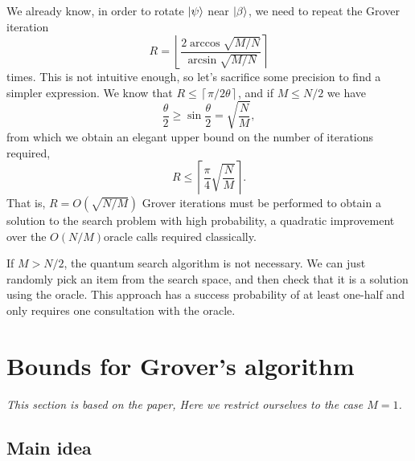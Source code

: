 \documentclass[a4paper,10pt]{book}
\numberwithin{equation}{section}
\begin{document}
We already know, in order to rotate $\ket{\psi}$ near $\ket{\beta}$, we need to repeat the Grover iteration
\begin{equation}\label{eq:IterationsGrover}
    R=\left\lfloor\frac{2\arccos\sqrt{M/N}}{\arcsin\sqrt{M/N}}\right\rceil
\end{equation}
times. This is not intuitive enough, so let's sacrifice some precision to find a simpler expression. We know that $R\leq\left\lceil\pi/2\theta\right\rceil$, and if $M\leq N/2$ we have
\begin{equation}
    \frac{\theta}{2}\geq\sin\frac{\theta}{2}=\sqrt{\frac{N}{M}},
\end{equation}
from which we obtain an elegant upper bound on the number of iterations required,
\begin{equation}
    R\leq\left\lceil\frac{\pi}{4}\sqrt{\frac{N}{M}}\right\rceil.
\end{equation}
That is, $R=O(\sqrt{N/M})$ Grover iterations must be performed to obtain a solution to the search problem with high probability, a quadratic improvement over the $O(N/M)$oracle calls required classically.

If $M>N/2$, the quantum search algorithm is not necessary. We can just randomly pick an item from the search space, and then check that it is a solution using the oracle. This approach has a success probability of at least one-half and only requires one consultation with the oracle.



\section{Bounds for Grover's algorithm}

\textit{This section is based on the paper\cite{2009Exact}, Here we restrict ourselves to the case $M=1$.}

\subsection{Main idea}
\end{document}
